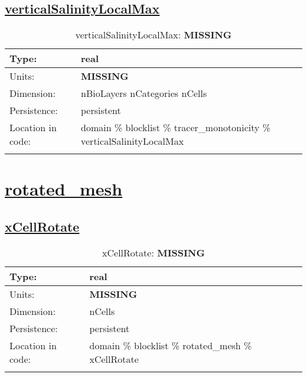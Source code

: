 \subsection[verticalSalinityLocalMax]{\hyperref[sec:var_tab_tracer_monotonicity]{verticalSalinityLocalMax}}
\label{subsec:var_sec_tracer_monotonicity_verticalSalinityLocalMax}
\begin{center}
\begin{longtable}{| p{2.0in} | p{4.0in} |}
        \hline 
        Type: & real \\
        \hline 
        Units: & {\bf \color{red} MISSING} \\
        \hline 
        Dimension: & nBioLayers nCategories nCells \\
        \hline 
        Persistence: & persistent \\
        \hline 
         Location in code: & domain \% blocklist \% tracer\_monotonicity \% verticalSalinityLocalMax \\
         \hline 
    \caption{verticalSalinityLocalMax: {\bf \color{red} MISSING}}
\end{longtable}
\end{center}
\section[rotated\_mesh]{\hyperref[sec:var_tab_rotated_mesh]{rotated\_mesh}}
\label{sec:var_sec_rotated_mesh}
\subsection[xCellRotate]{\hyperref[sec:var_tab_rotated_mesh]{xCellRotate}}
\label{subsec:var_sec_rotated_mesh_xCellRotate}
\begin{center}
\begin{longtable}{| p{2.0in} | p{4.0in} |}
        \hline 
        Type: & real \\
        \hline 
        Units: & {\bf \color{red} MISSING} \\
        \hline 
        Dimension: & nCells \\
        \hline 
        Persistence: & persistent \\
        \hline 
         Location in code: & domain \% blocklist \% rotated\_mesh \% xCellRotate \\
         \hline 
    \caption{xCellRotate: {\bf \color{red} MISSING}}
\end{longtable}
\end{center}

